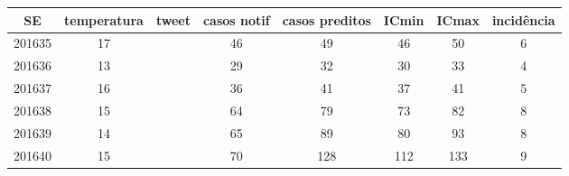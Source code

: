 \begin{tabular}{c|ccccccc}
  \hline
SE & temperatura & tweet & casos notif & casos preditos & ICmin & ICmax & incidência \\ 
  \hline
201635 & 17 &  & 46 & 49 & 46 & 50 & 6 \\ 
  201636 & 13 &  & 29 & 32 & 30 & 33 & 4 \\ 
  201637 & 16 &  & 36 & 41 & 37 & 41 & 5 \\ 
  201638 & 15 &  & 64 & 79 & 73 & 82 & 8 \\ 
  201639 & 14 &  & 65 & 89 & 80 & 93 & 8 \\ 
  201640 & 15 &  & 70 & 128 & 112 & 133 & 9 \\ 
   \hline
\end{tabular}
